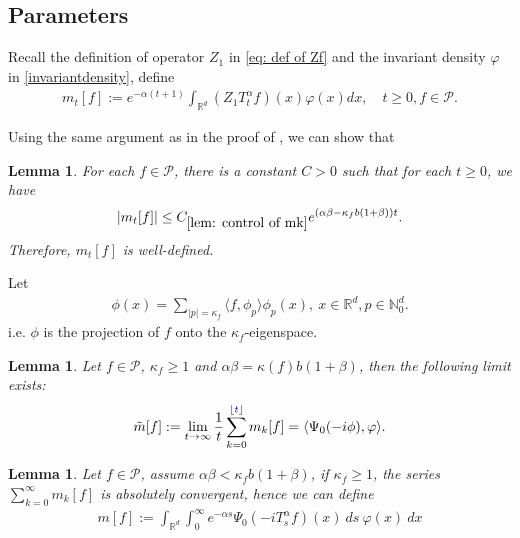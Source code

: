 \documentclass[12pt,oneside,english]{amsart}
\theoremstyle{plain}
\newtheorem{lem}[thm]{Lemma}
\theoremstyle{definition}
\numberwithin{equation}{section}
\newcommand{\added}[1]{{\color{blue}#1}}\newcommand{\deleted}[1]{{\color{red}#1}}
\begin{document}
\subsection{Parameters}
\added{
 Recall the definition of operator $Z_1$ in \eqref{eq: def of Zf} and the invariant density $\varphi$ in \eqref{invariantdensity}, define
 \begin{align}\label{parameter_mk}
      m_t[f]:=e^{-\alpha (t+1)}\int_{\mathbb R^d} (Z_1T_t^{\alpha}f)(x)\varphi(x)dx,\quad t\geq 0, f\in \mathcal P.
 \end{align}
 }
 \added{
 Using the same argument as in the proof of \cite[Lemma2.7, Lemma4.2 \& Lemma 5.1]{MM}, we can show that
 \begin{lem}\label{lem: control of mk}
For each $f\in\mathcal{P}$, there is a constant $C>0$ such that for each $t\geq 0$, we have
$$|m_t[f]|\leq C_{\ref{lem: control of mk}} e^{(\alpha\beta-\kappa_fb(1+\beta))t}.$$
Therefore, $m_t[f]$ is well-defined.
\end{lem}
Let
\begin{align}
    \phi(x)=\sum_{|p|=\kappa_f}\langle f, \phi_p\rangle\phi_p(x),~x\in \mathbb{R}^d, p \in\mathbb{N}_0^d.
\end{align}
i.e. $\phi$ is the projection of $f$ onto the $\kappa_f$-eigenspace.
\begin{lem}\label{lemma210}
Let $f \in \mathcal{P}$, $\kappa_f\geq 1$ and $\alpha\beta=\kappa(f)b(1+\beta)$, then the following limit exists:
\begin{align}
    \tilde{m}[f]:=\lim_{t\rightarrow \infty}\frac{1}{t}\sum_{k=0}^{\added{\lfloor t \rfloor}}m_k[f]=\langle\Psi_0(-i\phi),\varphi\rangle.
\end{align}
\end{lem}

\begin{lem}\label{lemma211}
Let $f\in \mathcal{P}$, assume $\alpha\beta<\kappa_fb(1+\beta)$, if $\kappa_f\geq 1$, the series $\sum_{k=0}^{\infty}m_k[f]$ is absolutely convergent, hence we can define
\begin{align}
    m[f]:=\int_{\mathbb{R}^d}\int_0^{\infty} e^{-\alpha s}\Psi_0(-iT_{s}^{\alpha}f)(x)~ds~\varphi(x)~dx \label{msmallcase}
\end{align}
\end{lem}
 }
\end{document}
